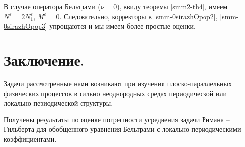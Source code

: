 \documentclass[a4paper,12pt]{article}
\theoremstyle{definition}
\begin{document}
В случае оператора Бельтрами ($\nu=0$), ввиду теоремы \ref{smm2-th4}, имеем
$N^\varepsilon=2N_1^\varepsilon$, $M^\varepsilon=0$. Следовательно, корректоры в \eqref{smm-0sirazhOpop2}, \eqref{smm-0sirazhOpop3} упрощаются
и мы имеем более простые оценки.



 \section{Заключение.}

 Задачи рассмотренные нами возникают при изучении плоско-парал\-лельных физических процессов в сильно неоднородных
 средах периодической или локально-периодической структуры.

 Получены результаты по оценке погрешности усреднения задачи Римана -- Гильберта для обобщенного уравнения Бельтрами
 с локально-периодическими коэффициентами.
\end{document}
